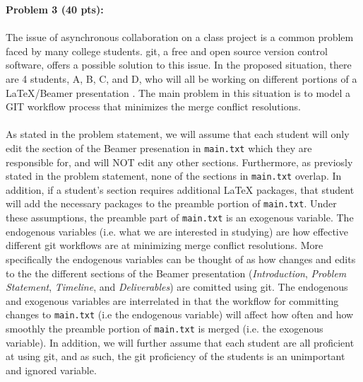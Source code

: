 \documentclass[12pt]{article}
\begin{document}
\newpage
\noindent\textbf{Problem 3 (40 pts):}

\paragraph{} The issue of asynchronous collaboration on a class project is a common problem faced by many college students. git, a free and open source version control software, offers a possible solution to this issue. In the proposed situation, there are 4 students, A, B, C, and D, who will all be working on different portions of a LaTeX/Beamer presentation . The main problem in this situation is to model a GIT workflow process that minimizes the merge conflict resolutions. 

\paragraph{} As stated in the problem statement, we will assume that each student will only edit the section of the Beamer presenation in \texttt{main.txt} which they are responsible for, and will NOT edit any other sections. Furthermore, as previosly stated in the problem statement, none of the sections in \texttt{main.txt} overlap. In addition, if a student's section requires additional LaTeX packages, that student will add the necessary packages to the preamble portion of \texttt{main.txt}. Under these assumptions, the preamble part of \texttt{main.txt} is an exogenous variable. The endogenous variables (i.e. what we are interested in studying) are how effective different git workflows are at minimizing merge conflict resolutions. More specifically the endogenous variables can be thought of as how changes and edits to the the different sections of the Beamer presentation (\emph{Introduction}, \emph{Problem Statement}, \emph{Timeline}, and \emph{Deliverables}) are comitted using git. The endogenous and exogenous variables are interrelated in that the workflow for committing changes to \texttt{main.txt} (i.e the endogenous variable) will affect how often and how smoothly the preamble portion of \texttt{main.txt} is merged (i.e. the exogenous variable). In addition, we will further assume that each student are all proficient at using git, and as such, the git proficiency of the students is an unimportant and ignored variable.
\end{document}
